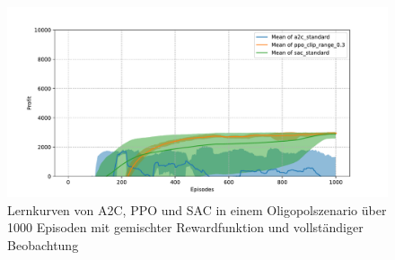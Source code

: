 \begin{figure}[htb]
	\centering
	\includegraphics[width=\textwidth]{appendix/comparison_oligopoly_mixed.pdf}
	\caption{Lernkurven von A2C, PPO und SAC in einem Oligopolszenario über 1000 Episoden mit gemischter Rewardfunktion und vollständiger Beobachtung}
	\label{graphic:OligopolyMixedComparison}
\end{figure}